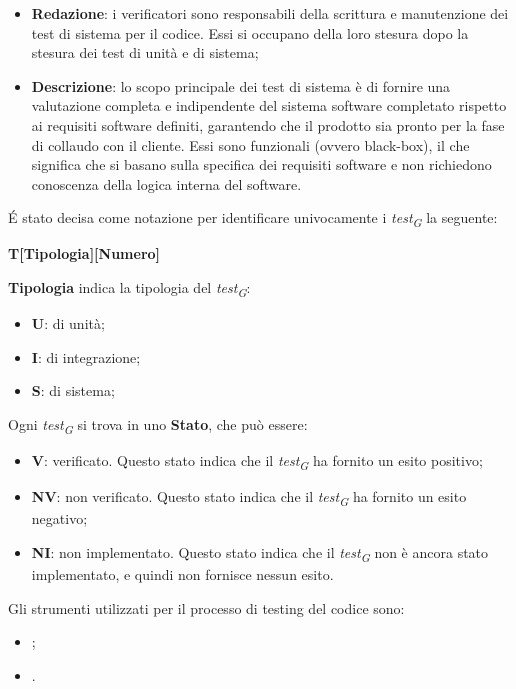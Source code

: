 \begin{itemize}
    \item \textbf{Redazione}: i verificatori sono responsabili della scrittura e manutenzione dei test di sistema per il codice. Essi si occupano della loro stesura dopo la stesura dei test di unità e di sistema;
    \item \textbf{Descrizione}: lo scopo principale dei test di sistema è di fornire una valutazione completa e indipendente del sistema software completato rispetto ai requisiti software definiti, garantendo che il prodotto sia pronto per la fase di collaudo con il cliente. Essi sono funzionali (ovvero black-box), il che significa che si basano sulla specifica dei requisiti software e non richiedono conoscenza della logica interna del software.
\end{itemize}

\'E stato decisa come notazione per identificare univocamente i \textit{test\textsubscript{G}} la seguente:
\begin{center}
    \textbf{T[Tipologia][Numero]}
\end{center}
\textbf{Tipologia} indica la tipologia del \textit{test\textsubscript{G}}:
\begin{itemize}
    \item \textbf{U}: di unità;
    \item \textbf{I}: di integrazione;
    \item \textbf{S}: di sistema;
\end{itemize}
Ogni \textit{test\textsubscript{G}} si trova in uno \textbf{Stato}, che può essere:
\begin{itemize}
    \item \textbf{V}: verificato. Questo stato indica che il \textit{test\textsubscript{G}} ha fornito un esito positivo;
    \item \textbf{NV}: non verificato. Questo stato indica che il \textit{test\textsubscript{G}} ha fornito un esito negativo;
    \item \textbf{NI}: non implementato. Questo stato indica che il \textit{test\textsubscript{G}} non è ancora stato implementato, e quindi non fornisce nessun esito.
\end{itemize}

Gli strumenti utilizzati per il processo di testing del codice sono:
\begin{itemize}
    \item {};
    \item {}.
\end{itemize}

